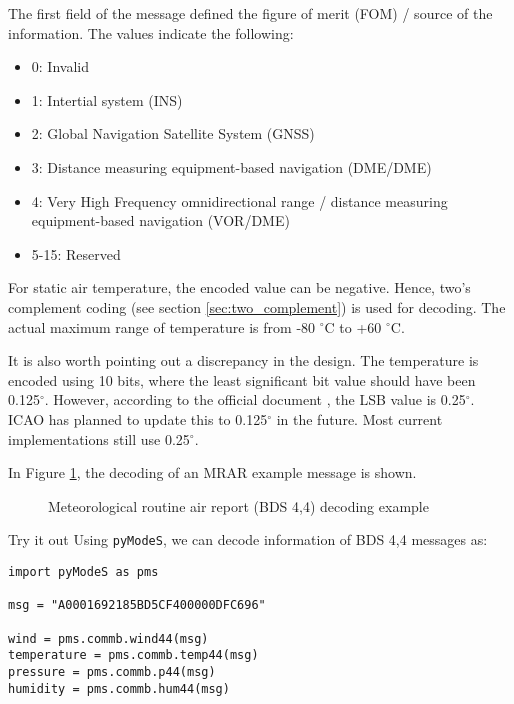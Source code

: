 The first field of the message defined the figure of merit (FOM) / source of the information. The values indicate the following:
\begin{itemize}
    \item 0: Invalid
    \item 1: Intertial system (INS)
    \item 2: Global Navigation Satellite System (GNSS)
    \item 3: Distance measuring equipment-based navigation (DME/DME)
    \item 4: Very High Frequency omnidirectional range / distance measuring equipment-based navigation (VOR/DME)
    \item 5-15: Reserved
\end{itemize}

For static air temperature, the encoded value can be negative. Hence, two's complement coding (see section \ref{sec:two_complement}) is used for decoding. The actual maximum range of temperature is from -80 $^\circ$C to +60 $^\circ$C.

It is also worth pointing out a discrepancy in the design. The temperature is encoded using 10 bits, where the least significant bit value should have been 0.125$^\circ$. However, according to the official document \cite{icao9871v1}, the LSB value is 0.25$^\circ$. ICAO has planned to update this to 0.125$^\circ$ in the future. Most current implementations still use 0.25$^\circ$. 

In Figure \ref{fig:bds44_example}, the decoding of an MRAR example message is shown.

\begin{figure}[ht]
    \centering
    
    \caption{Meteorological routine air report (BDS 4,4) decoding example}
    \label{fig:bds44_example}
  \end{figure}
  
\begin{notebox}{Try it out}
Using \texttt{pyModeS}, we can decode information of BDS 4,4 messages as: 

\begin{verbatim}
import pyModeS as pms

msg = "A0001692185BD5CF400000DFC696"

wind = pms.commb.wind44(msg)
temperature = pms.commb.temp44(msg)
pressure = pms.commb.p44(msg)
humidity = pms.commb.hum44(msg)
\end{verbatim}

\end{notebox}

